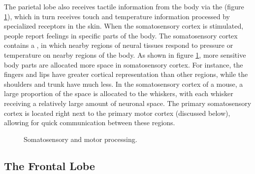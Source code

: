 The parietal lobe also receives tactile information from the body via the  (figure \ref{brain_motor}), which in turn receives touch and temperature information processed by specialized receptors in the skin. When the somatosensory cortex is stimulated, people report feelings in specific parts of the body. The somatosensory cortex contains a , in which nearby regions of neural tissues respond to pressure or temperature on nearby regions of the body. As shown in figure \ref{brain_motor}, more sensitive body parts are allocated more space in somatosensory cortex. For instance, the fingers and lips have greater cortical representation than other regions, while the shoulders and trunk have much less. In the somatosensory cortex of a mouse, a large proportion of the space is allocated to the whiskers, with each whisker receiving a relatively large amount of neuronal space. The primary somatosensory cortex is located right next to the primary motor cortex (discussed below), allowing for quick communication between these regions. 

\begin{figure}[h]
\centering
{}
\caption[Pamela Payne.]{Somatosensory and motor processing.}
\label{brain_motor}
\end{figure}

\subsection{The Frontal Lobe}
 

